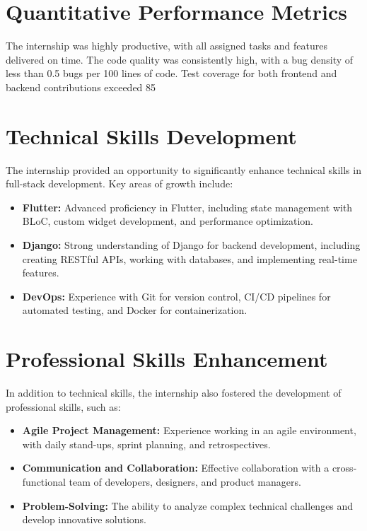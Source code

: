 \section{Quantitative Performance Metrics}
The internship was highly productive, with all assigned tasks and features delivered on time. The code quality was consistently high, with a bug density of less than 0.5 bugs per 100 lines of code. Test coverage for both frontend and backend contributions exceeded 85%

\section{Technical Skills Development}
The internship provided an opportunity to significantly enhance technical skills in full-stack development. Key areas of growth include:
\begin{itemize}
    \item \textbf{Flutter:} Advanced proficiency in Flutter, including state management with BLoC, custom widget development, and performance optimization.
    \item \textbf{Django:} Strong understanding of Django for backend development, including creating RESTful APIs, working with databases, and implementing real-time features.
    \item \textbf{DevOps:} Experience with Git for version control, CI/CD pipelines for automated testing, and Docker for containerization.
\end{itemize}

\section{Professional Skills Enhancement}
In addition to technical skills, the internship also fostered the development of professional skills, such as:
\begin{itemize}
    \item \textbf{Agile Project Management:} Experience working in an agile environment, with daily stand-ups, sprint planning, and retrospectives.
    \item \textbf{Communication and Collaboration:} Effective collaboration with a cross-functional team of developers, designers, and product managers.
    \item \textbf{Problem-Solving:} The ability to analyze complex technical challenges and develop innovative solutions.
\end{itemize}

